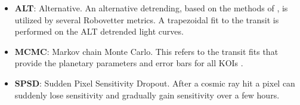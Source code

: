 \begin{itemize}
\item[] \textbf{ALT}: Alternative. An alternative detrending, based on the methods of \citet{Garcia2010}, is utilized by several Robovetter metrics. A trapezoidal fit to the transit is performed on the ALT detrended light curves.
\item[] \textbf{MCMC}: Markov chain Monte Carlo. This refers to the transit fits that provide the planetary parameters and error bars for all KOIs \citep{Hoffman2017}.
\item[] \textbf{SPSD}: Sudden Pixel Sensitivity Dropout.  After a cosmic ray hit a pixel can suddenly lose sensitivity and gradually gain sensitivity over a few hours.

\end{itemize}
